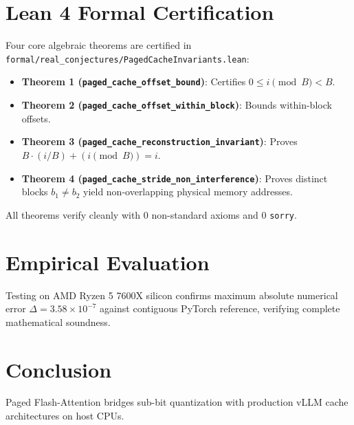 \documentclass[10pt,twocolumn,letterpaper]{article}
\begin{document}
\section{Lean 4 Formal Certification}
Four core algebraic theorems are certified in \texttt{formal/real\_conjectures/PagedCacheInvariants.lean}:
\begin{itemize}
    \item \textbf{Theorem 1 (\texttt{paged\_cache\_offset\_bound})}: Certifies $0 \le i \pmod{B} < B$.
    \item \textbf{Theorem 2 (\texttt{paged\_cache\_offset\_within\_block})}: Bounds within-block offsets.
    \item \textbf{Theorem 3 (\texttt{paged\_cache\_reconstruction\_invariant})}: Proves $B \cdot (i / B) + (i \pmod{B}) = i$.
    \item \textbf{Theorem 4 (\texttt{paged\_cache\_stride\_non\_interference})}: Proves distinct blocks $b_1 \ne b_2$ yield non-overlapping physical memory addresses.
\end{itemize}
All theorems verify cleanly with 0 non-standard axioms and 0 \texttt{sorry}.

\section{Empirical Evaluation}
Testing on AMD Ryzen 5 7600X silicon confirms maximum absolute numerical error $\Delta = 3.58 \times 10^{-7}$ against contiguous PyTorch reference, verifying complete mathematical soundness.

\section{Conclusion}
Paged Flash-Attention bridges sub-bit quantization with production vLLM cache architectures on host CPUs.
\end{document}
